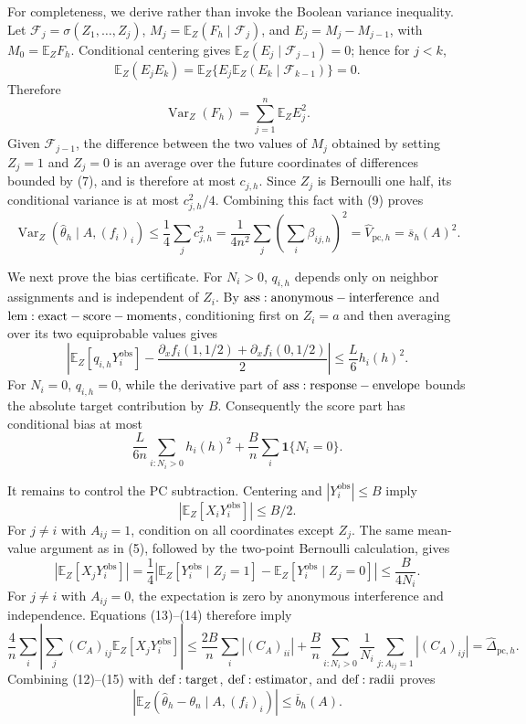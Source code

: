 For completeness, we derive rather than invoke the Boolean variance inequality.  Let \(\mathcal F_j=\sigma(Z_1,\ldots,Z_j)\), \(M_j=\mathbb E_Z(F_h\mid\mathcal F_j)\), and \(E_j=M_j-M_{j-1}\), with \(M_0=\mathbb E_ZF_h\).  Conditional centering gives \(\mathbb E_Z(E_j\mid\mathcal F_{j-1})=0\); hence for \(j<k\),
\[
 \mathbb E_Z(E_jE_k)=\mathbb E_Z\{E_j\mathbb E_Z(E_k\mid\mathcal F_{k-1})\}=0.
\tag{8}
\]
Therefore
\[
 \operatorname{Var}_Z(F_h)=\sum_{j=1}^n\mathbb E_ZE_j^2.
\tag{9}
\]
Given \(\mathcal F_{j-1}\), the difference between the two values of \(M_j\) obtained by setting \(Z_j=1\) and \(Z_j=0\) is an average over the future coordinates of differences bounded by (7), and is therefore at most \(c_{j,h}\).  Since \(Z_j\) is Bernoulli one half, its conditional variance is at most \(c_{j,h}^2/4\).  Combining this fact with (9) proves
\[
 \operatorname{Var}_Z(\widehat\theta_h\mid A,(f_i)_i)
 \le\frac14\sum_jc_{j,h}^2
 =\frac1{4n^2}\sum_j\left(\sum_i\beta_{ij,h}\right)^2
 =\widehat V_{\mathrm{pc},h}
 =\overline s_h(A)^2.
\tag{10}
\]

We next prove the bias certificate.  For \(N_i>0\), \(q_{i,h}\) depends only on neighbor assignments and is independent of \(Z_i\).  By \({\rm ass:anonymous-interference}\) and \({\rm lem:exact-score-moments}\), conditioning first on \(Z_i=a\) and then averaging over its two equiprobable values gives
\[
 \left|\mathbb E_Z[q_{i,h}Y_i^{\mathrm{obs}}]
 -\frac{\partial_xf_i(1,1/2)+\partial_xf_i(0,1/2)}2\right|
 \le\frac L6h_i(h)^2.
\tag{11}
\]
For \(N_i=0\), \(q_{i,h}=0\), while the derivative part of \({\rm ass:response-envelope}\) bounds the absolute target contribution by \(B\).  Consequently the score part has conditional bias at most
\[
 \frac{L}{6n}\sum_{i:N_i>0}h_i(h)^2
 +\frac Bn\sum_i\mathbf1\{N_i=0\}.
\tag{12}
\]

It remains to control the PC subtraction.  Centering and \(|Y_i^{\mathrm{obs}}|\le B\) imply
\[
 |\mathbb E_Z[X_iY_i^{\mathrm{obs}}]|\le B/2.
\tag{13}
\]
For \(j\ne i\) with \(A_{ij}=1\), condition on all coordinates except \(Z_j\).  The same mean-value argument as in (5), followed by the two-point Bernoulli calculation, gives
\[
 |\mathbb E_Z[X_jY_i^{\mathrm{obs}}]|
 =\frac14\left|\mathbb E_Z[Y_i^{\mathrm{obs}}\mid Z_j=1]
 -\mathbb E_Z[Y_i^{\mathrm{obs}}\mid Z_j=0]\right|
 \le\frac B{4N_i}.
\tag{14}
\]
For \(j\ne i\) with \(A_{ij}=0\), the expectation is zero by anonymous interference and independence.  Equations (13)--(14) therefore imply
\[
 \frac4n\sum_i\left|\sum_j(C_A)_{ij}\mathbb E_Z[X_jY_i^{\mathrm{obs}}]\right|
 \le\frac{2B}{n}\sum_i|(C_A)_{ii}|
 +\frac Bn\sum_{i:N_i>0}\frac1{N_i}\sum_{j:A_{ij}=1}|(C_A)_{ij}|
 =\widehat\Delta_{\mathrm{pc},h}.
\tag{15}
\]
Combining (12)--(15) with \({\rm def:target}\), \({\rm def:estimator}\), and \({\rm def:radii}\) proves
\[
 \left|\mathbb E_Z(\widehat\theta_h-\theta_n\mid A,(f_i)_i)\right|
 \le\overline b_h(A).
\tag{16}
\]

